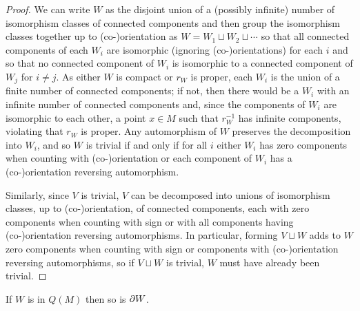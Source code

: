 \begin{proof}
	We can write $W$ as the disjoint union of a (possibly infinite) number of isomorphism classes of connected components and then group the isomorphism classes together up to (co\nobreakdash-)orientation as $W = W_1 \sqcup W_2 \sqcup \cdots$ so that all connected components of each $W_i$ are isomorphic (ignoring (co\nobreakdash-)orientations) for each $i$ and so that no connected component of $W_i$ is isomorphic to a connected component of $W_j$ for $i\neq j$.
	As either $W$ is compact or $r_W$ is proper, each $W_i$ is the union of a finite number of connected components; if not, then there would be a $W_i$ with an infinite number of connected components and, since the components of $W_i$ are isomorphic to each other, a point $x\in M$ such that $r_W^{-1}$ has infinite components, violating that $r_W$ is proper.
	Any automorphism of $W$ preserves the decomposition into $W_i$, and so $W$ is trivial if and only if for all $i$ either $W_i$ has zero components when counting with (co\nobreakdash-)orientation or each component of $W_i$ has a (co\nobreakdash-)orientation reversing automorphism.

	Similarly, since $V$ is trivial, $V$ can be decomposed into unions of isomorphism classes, up to (co\nobreakdash-)orienta\-tion, of connected components, each with zero components when counting with sign or with all components having (co\nobreakdash-)orientation reversing automorphisms.
	In particular, forming $V \sqcup W$ adds to $W$ zero components when counting with sign or components with (co\nobreakdash-)orientation reversing automorphisms, so if $V \sqcup W$ is trivial, $W$ must have already been trivial.
\end{proof}

\begin{lemma}\label{L: bd defined}
	If $W$ is in $Q(M)$ then so is $\partial W$.
\end{lemma}

